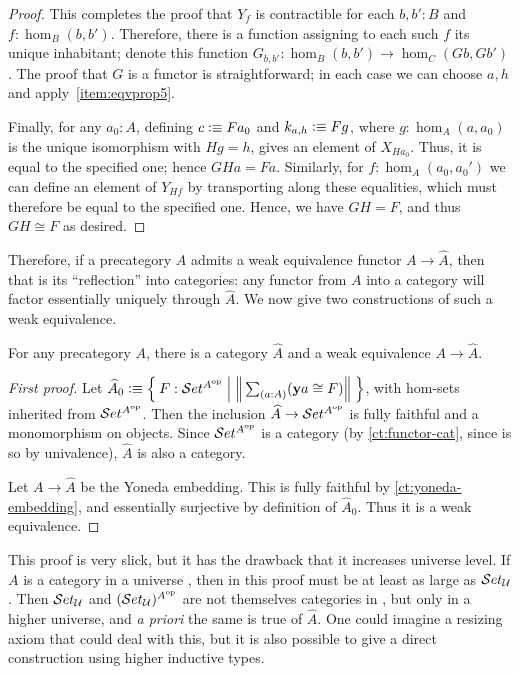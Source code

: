 \begin{proof}
  This completes the proof that $Y_f$ is contractible for each $b,b':B$ and $f:\hom_B(b,b')$.
  Therefore, there is a function assigning to each such $f$ its unique inhabitant; denote this function $G_{b,b'}:\hom_B(b,b') \to \hom_C(Gb,Gb')$.
  The proof that $G$ is a functor is straightforward; in each case we can choose $a,h$ and apply~\ref{item:eqvprop5}.

  Finally, for any $a_0:A$, defining $c\vcentcolon\equiv Fa_0$ and $k_{a,h}\vcentcolon\equiv F g$, where $g:\hom_A(a,a_0)$ is the unique isomorphism with $Hg = h$, gives an element of $X_{Ha_0}$.
  Thus, it is equal to the specified one; hence $GHa=Fa$.
  Similarly, for $f:\hom_A(a_0,a_0')$ we can define an element of $Y_{Hf}$ by transporting along these equalities, which must therefore be equal to the specified one.
  Hence, we have $GH=F$, and thus $GH\cong F$ as desired.
\end{proof}

Therefore, if a precategory $A$ admits a weak equivalence functor $A\to \hat{A}$, then that is its ``reflection'' into categories: any functor from $A$ into a category will factor essentially uniquely through $\widehat{A}$.
We now give two constructions of such a weak equivalence.

\begin{thm}
  For any precategory $A$, there is a category $\widehat A$ and a weak equivalence $A\to\widehat{A}$.
\end{thm}

\begin{proof}[First proof]
  Let $\widehat{A}_0 \defeq \setof{ F:\uset^{A\op} | \Brck{\sm{a:A} (\y a \cong F)}}$, with hom-sets inherited from $\mathcal{S}et^{A^{\textrm{op}}}$.
  Then the inclusion $\widehat{A} \to \mathcal{S}et^{A^{\textrm{op}}}$ is fully faithful and a monomorphism on objects.
  Since $\mathcal{S}et^{A^{\textrm{op}}}$ is a category (by \autoref{ct:functor-cat}, since \uset is so by univalence), $\widehat A$ is also a category.

  Let $A\to\widehat A$ be the Yoneda embedding.
  This is fully faithful by \autoref{ct:yoneda-embedding}, and essentially surjective by definition of $\widehat{A}_0$.
  Thus it is a weak equivalence.
\end{proof}

This proof is very slick, but it has the drawback that it increases universe level.
If $A$ is a category in a universe \bbU, then in this proof \uset must be at least as large as $\mathcal{S}et_\mathcal{U}$.
Then $\mathcal{S}et_\mathcal{U}$ and $(\mathcal{S}et_\mathcal{U})^{A^{\textrm{op}}}$ are not themselves categories in \bbU, but only in a higher universe, and \emph{a priori} the same is true of $\widehat A$.
One could imagine a resizing axiom that could deal with this, but it is also possible to give a direct construction using higher inductive types.

